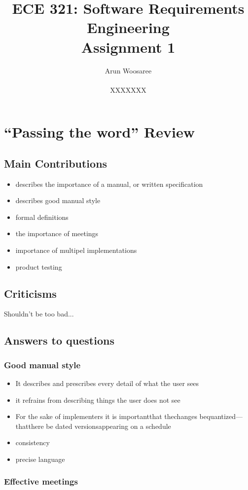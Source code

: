 \documentclass[letterpaper,12pt]{article}
\title{ECE 321: Software Requirements Engineering \\ Assignment 1}
\author{Arun Woosaree \\ \\ XXXXXXX}
\begin{document}
\maketitle

\section{``Passing the word'' Review}

\subsection{Main Contributions}
\begin{itemize}
 \item describes the importance of a manual, or written specification
 \item describes good manual style
 \item formal definitions
 \item the importance of meetings
 \item importance of multipel implementations
 \item product testing
\end{itemize}

\subsection{Criticisms}
Shouldn't be too bad...

\subsection{Answers to questions}
\subsubsection{Good manual style}
\begin{itemize}
 \item It describes  and  prescribes  every  detail  of  what  the  user sees
 \item it refrains from describing things the user does not see
 \item For  the  sake of  implementers  it is  importantthat  thechanges  bequantized—thatthere  be  dated versionsappearing  on a  schedule
 \item consistency
 \item precise language
\end{itemize}
\subsubsection{Effective meetings}
\end{document}
